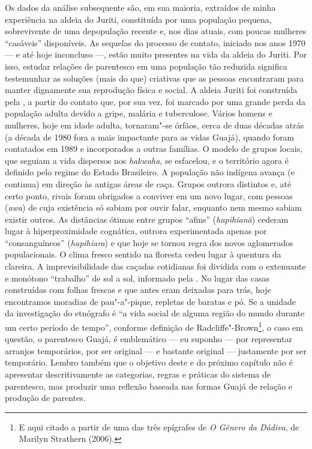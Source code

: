Os dados da análise subsequente são, em sua maioria, extraídos de minha
experiência na aldeia do  Juriti, constituída por uma população
pequena, sobrevivente de uma depopulação recente e, nos dias atuais, com
poucas mulheres ``casáveis'' disponíveis. As sequelas do processo de
contato, iniciado nos anos 1970 --- e até hoje inconcluso ---, estão muito
presentes na vida da aldeia do  Juriti. Por isso, estudar relações de
parentesco em uma população tão reduzida significa testemunhar as
soluções (mais do que) criativas que as pessoas encontraram para manter
dignamente sua reprodução física e social. A aldeia Juriti foi
construída pela , a partir do contato que, por sua vez, foi marcado
por uma grande perda da população adulta devido a gripe, malária e
tuberculose. Vários homens e mulheres, hoje em idade adulta, tornaram"-se
órfãos, cerca de duas décadas atrás (a década de 1980 fora a mais
impactante para as vidas Guajá), quando foram contatados em 1989 e
incorporados a outras famílias. O modelo de grupos locais, que seguiam a
vida dispersos nos \emph{hakwaha}, se esfacelou, e o território agora é
definido pelo regime do Estado Brasileiro. A população não indígena
avança (e continua) em direção às antigas áreas de caça. Grupos outrora
distintos e, até certo ponto, rivais foram obrigados a conviver em um
novo lugar, com pessoas (\emph{awa}) de cuja existência só sabiam por
ouvir falar, enquanto nem mesmo sabiam existir outros. As distâncias
ótimas entre grupos ``afins'' (\emph{hapihianã}) cederam lugar à
hiperproximidade cognática, outrora experimentada apenas por
``consanguíneos'' (\emph{hapihiara}) e que hoje se tornou regra dos novos
aglomerados populacionais. O clima fresco sentido na floresta cedeu
lugar à quentura da clareira. A imprevisibilidade das caçadas cotidianas
foi dividida com o extenuante e monótono ``trabalho'' de sol a sol,
informado pela . No lugar das casas construídas com folhas frescas
e que antes eram deixadas para trás, hoje encontramos moradias de
pau"-a"-pique, repletas de baratas e pó. Se a unidade da investigação do
etnógrafo é ``a vida social de alguma região do mundo durante um certo
período de tempo'', conforme definição de Radcliffe"-Brown\footnote{E aqui
  citado a partir de uma das três epígrafes de \emph{O Gênero da
  Dádiva}, de Marilyn Strathern (2006).}, o caso em questão, o
parentesco Guajá, é emblemático --- eu suponho --- por representar arranjos
temporários, por ser original --- e bastante original --- justamente por ser
temporário. Lembro também que o objetivo deste e do próximo capítulo não
é apresentar descritivamente as categorias, regras e práticas do sistema
de parentesco, mas produzir uma reflexão baseada nas formas Guajá de
relação e produção de parentes.

